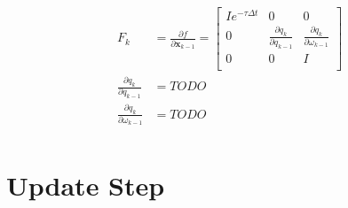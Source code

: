 \documentclass[11pt]{article}
\newcommand{\pd}[2]{\frac{\partial #1}{\partial #2}} %
\begin{document}
\begin{align*}
    F_k &= \pd{f}{\mathbf{x}_{k-1}} = \begin{bmatrix}
        Ie^{-\tau \Delta t} & 0 & 0 \\
        0 & \pd{q_k}{q_{k-1}} & \pd{q_k}{\omega_{k-1}} \\
        0 & 0 & I \\
    \end{bmatrix} \\
    \pd{q_k}{q_{k-1}} &= TODO \\
    \pd{q_k}{\omega_{k-1}} &= TODO \\
\end{align*}

\section{Update Step}
\end{document}
